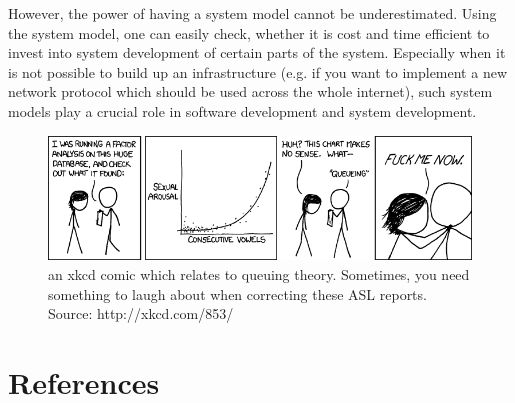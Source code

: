 \documentclass[a4paper]{article}
\begin{document}
However, the power of having a system model cannot be underestimated. Using the system model, one can easily check, whether it is cost and time efficient to invest into system development of certain parts of the system. Especially when it is not possible to build up an infrastructure (e.g. if you want to implement a new network protocol which should be used across the whole internet), such system models play a crucial role in software development and system development.\\

\begin{figure}[H]
	\begin{center}
    \includegraphics[scale=0.52]{consecutive_vowels.png}
  \end{center}
  \caption{an xkcd comic which relates to queuing theory. Sometimes, you need something to laugh about when correcting these ASL reports. Source: http://xkcd.com/853/}
\end{figure}

\pagebreak

\section{References}





\end{document}
